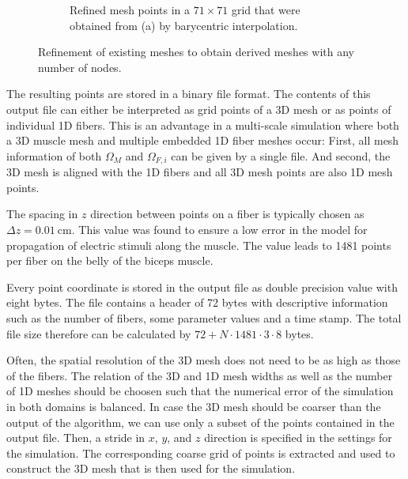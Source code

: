 \begin{figure}[H]
\begin{subfigure}[t]{0.48\textwidth}
    \caption{Refined mesh points in a $71\times 71$ grid that were obtained from (a) by barycentric interpolation.}%
    \label{fig:left_biceps_brachii_71x71fibers_bin_csv}%
  \end{subfigure}   
  \caption{Refinement of existing meshes to obtain derived meshes with any number of nodes.}%
  \label{fig:left_biceps_brachii_33x33fibers_refined}%
\end{figure}%


The resulting points are stored in a binary file format. The contents of this output file can either be interpreted as grid points of a 3D mesh or as points of individual 1D fibers. This is an advantage in a multi-scale simulation where both a 3D muscle mesh and multiple embedded 1D fiber meshes occur: First, all mesh information of both $\Omega_M$ and $\Omega_{F,i}$ can be given by a single file. And second, the 3D mesh is aligned with the 1D fibers and all 3D mesh points are also 1D mesh points. 

The spacing in $z$ direction between points on a fiber is typically chosen as $\Delta z = \SI{0.01}{\cm}$. This value was found to ensure a low error in the model for propagation of electric stimuli along the muscle. The value leads to 1481 points per fiber on the belly of the biceps muscle. 

Every point coordinate is stored in the output file as double precision value with eight bytes. The file contains a header of 72 bytes with descriptive information such as the number of fibers, some parameter values and a time stamp. The total file size therefore can be calculated by $72+N\cdot 1481\cdot 3\cdot 8$ bytes.

Often, the spatial resolution of the 3D mesh does not need to be as high as those of the fibers. The relation of the 3D and 1D mesh widths as well as the number of 1D meshes should be choosen such that the numerical error of the simulation in both domains is balanced.
In case the 3D mesh should be coarser than the output of the algorithm, we can use only a subset of the points contained in the output file. Then, a stride in $x$, $y$, and $z$ direction is specified in the settings for the simulation. The corresponding coarse grid of points is extracted and used to construct the 3D mesh that is then used for the simulation.



